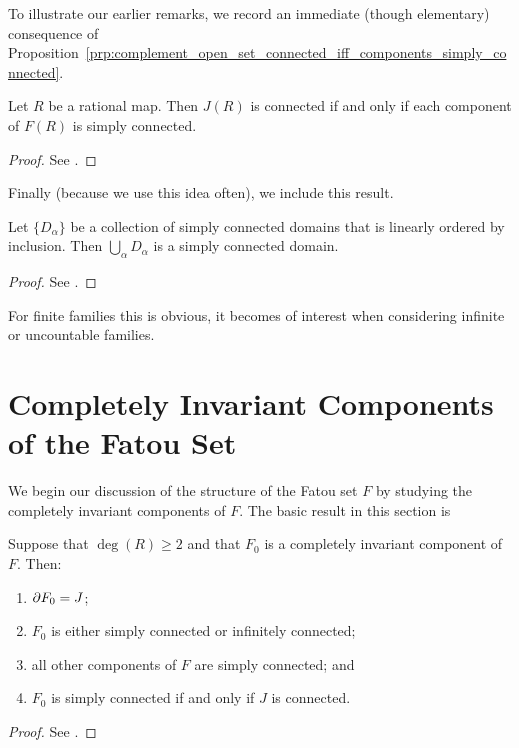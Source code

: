 To illustrate our earlier remarks, we record an immediate (though elementary)
consequence of
Proposition~\ref{prp:complement_open_set_connected_iff_components_simply_connected}.

\begin{proposition}
    Let $R$ be a rational map. Then $J(R)$ is connected if and only if each
    component of $F(R)$ is simply connected.
\end{proposition}
\begin{proof}
    See \cite[81]{Beardon1991}.
\end{proof}

Finally (because we use this idea often), we include this result.

\begin{proposition}
    Let $\{D_\alpha\}$ be a collection of simply connected domains that is
    linearly ordered by inclusion. Then $\bigcup_\alpha D_\alpha$ is a simply
    connected domain.
\end{proposition}
\begin{proof}
    See \cite[82]{Beardon1991}.
\end{proof}

For finite families this is obvious, it becomes of interest when considering
infinite or uncountable families.

\section{Completely Invariant Components of the Fatou Set}
\label{sec:completely_invariant_components_of_the_Fatou_set}

We begin our discussion of the structure of the Fatou set $F$ by studying the
completely invariant components of $F$. The basic result in this section is

\begin{theorem}
    \label{thm:connectedness_properties_of_completely_invariant_components_of_F}
    Suppose that $\deg(R) \geq 2$ and that $F_0$ is a completely invariant
    component of $F$. Then:
    \begin{enumerate}[label=(\roman*)]
        \item $\partial {F_0} = J$;
        \item $F_0$ is either simply connected or infinitely connected;
        \item all other components of $F$ are simply connected; and
        \item $F_0$ is simply connected if and only if $J$ is connected.
    \end{enumerate}
\end{theorem}
\begin{proof}
    See \cite[83]{Beardon1991}.
\end{proof}

